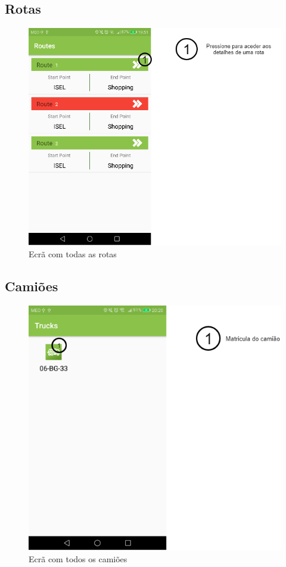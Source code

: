 \documentclass[10pt,a5paper]{article}
\begin{document}
\newpage
\subsection{Rotas} 

\begin{figure}[!h]
	\centering
	\includegraphics[width=1.1\textwidth]{Images/screens/routes_screenxml}
	\caption{Ecrã com todas as rotas}
	\label{fig:routes_screen}
\end{figure}

\newpage
\subsection{Camiões} 

\begin{figure}[!h]
	\centering
	\includegraphics[width=1.1\textwidth]{Images/screens/trucks_screen}
	\caption{Ecrã com todos os camiões}
	\label{fig:trucks_screen}
\end{figure}
\end{document}
